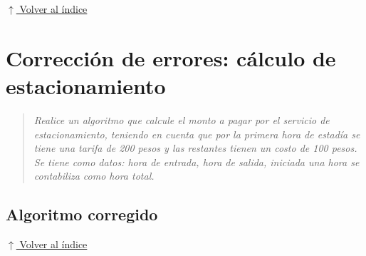 \documentclass[12pt]{article}
\newcommand{\pseudocodigo}[2]{%
}
\newcommand{\volverindice}{%
    \vspace{1em}%
    \begin{flushright}%
        \hyperlink{indice}{\small $\uparrow$ Volver al índice}%
    \end{flushright}%
}
\newcommand{\enunciado}[1]{%
    \begin{quote}
        \itshape #1
    \end{quote}
}
\begin{document}







\volverindice
\newpage


\section{Corrección de errores: cálculo de estacionamiento}

\enunciado{Realice un algoritmo que calcule el monto a pagar por el servicio de estacionamiento, teniendo en cuenta que por la primera hora de estadía se tiene una tarifa de 200 pesos y las restantes tienen un costo de 100 pesos. Se tiene como datos: hora de entrada, hora de salida, iniciada una hora se contabiliza como hora total.}



\subsection{Algoritmo corregido}

\pseudocodigo{ej10_estacionamiento}{Cálculo del monto de estacionamiento}

\volverindice
\newpage
\end{document}
